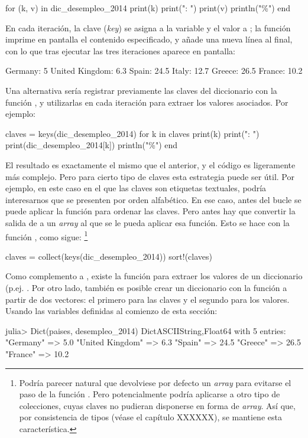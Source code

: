 ﻿\documentclass[spanish]{article}
\begin{document}
{{for (k, v) in dic_desempleo_2014
  print(k)
  print(": ")
  print(v)
  println("\%")
end

En cada iteración, la clave (\emph{key}) se asigna a la variable  y el valor a ; la función  imprime en pantalla el contenido especificado, y  añade una nueva línea al final, con lo que tras ejecutar las tres iteraciones aparece en pantalla:

Germany: 5%
United Kingdom: 6.3%
Spain: 24.5%
Italy: 12.7%
Greece: 26.5%
France: 10.2%

Una alternativa sería registrar previamente las claves del diccionario con la función , y utilizarlas en cada iteración para extraer los valores asociados. Por ejemplo:

claves = keys(dic_desempleo_2014)
for k in claves
  print(k)
  print(": ")
  print(dic_desempleo_2014[k])
  println("\%")
end

El resultado es exactamente el mismo que el anterior, y el código es ligeramente más complejo. Pero para cierto tipo de claves esta estrategia puede ser útil. Por ejemplo, en este caso en el que las claves son etiquetas textuales, podría interesarnos que se presenten por orden alfabético. En ese caso, antes del bucle se puede aplicar la función  para ordenar las claves. Pero antes hay que convertir la salida de  a un \emph{array} al que se le pueda aplicar esa función. Esto se hace con la función , como sigue:%
\footnote{%
Podría parecer natural que  devolviese por defecto un \emph{array} para evitarse el paso de la función . Pero potencialmente  podría aplicarse a otro tipo de colecciones, cuyas claves no pudieran disponerse en forma de \emph{array}. Así que, por consistencia de tipos (véase el capítulo XXXXXX), se mantiene esta característica.%
}

claves = collect(keys(dic_desempleo_2014))
sort!(claves)

Como complemento a , existe la función  para extraer los valores de un diccionario (p.ej. . Por otro lado, también es posible crear un diccionario con la función  a partir de dos vectores: el primero para las claves y el segundo para los valores. Usando las variables definidas al comienzo de esta sección:

julia> Dict(paises, desempleo_2014)
Dict{ASCIIString,Float64} with 5 entries:
  "Germany"        => 5.0
  "United Kingdom" => 6.3
  "Spain"          => 24.5
  "Greece"         => 26.5
  "France"         => 10.2

}}
\end{document}
